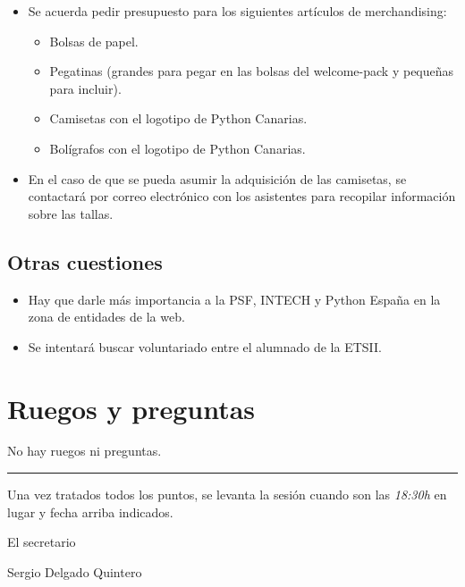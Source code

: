 \documentclass[a4paper, 12pt]{article}
\begin{document}
    \begin{itemize}
        \item Se acuerda pedir presupuesto para los siguientes artículos de merchandising:
        \begin{itemize}
            \item Bolsas de papel.
            \item Pegatinas (grandes para pegar en las bolsas del welcome-pack y pequeñas para incluir).
            \item Camisetas con el logotipo de Python Canarias.
            \item Bolígrafos con el logotipo de Python Canarias.
        \end{itemize}
        \item En el caso de que se pueda asumir la adquisición de las camisetas, se contactará por correo electrónico con los asistentes para recopilar información sobre las tallas.
    \end{itemize}
    
    \subsection*{Otras cuestiones}

    \begin{itemize}
        \item Hay que darle más importancia a la PSF, INTECH y Python España en la zona de entidades de la web.
        \item Se intentará buscar voluntariado entre el alumnado de la ETSII.
    \end{itemize}
    
    \section{Ruegos y preguntas}
    
    No hay ruegos ni preguntas.
    
    
    \vspace{1cm}
    \hrule
    \vspace{3mm}
    
    Una vez tratados todos los puntos, se levanta la sesión cuando son las \textit{18:30h} en lugar y fecha arriba indicados.
    
    \begin{flushright}
    El secretario
    
    Sergio Delgado Quintero
    \end{flushright}
    
    
\end{document}
